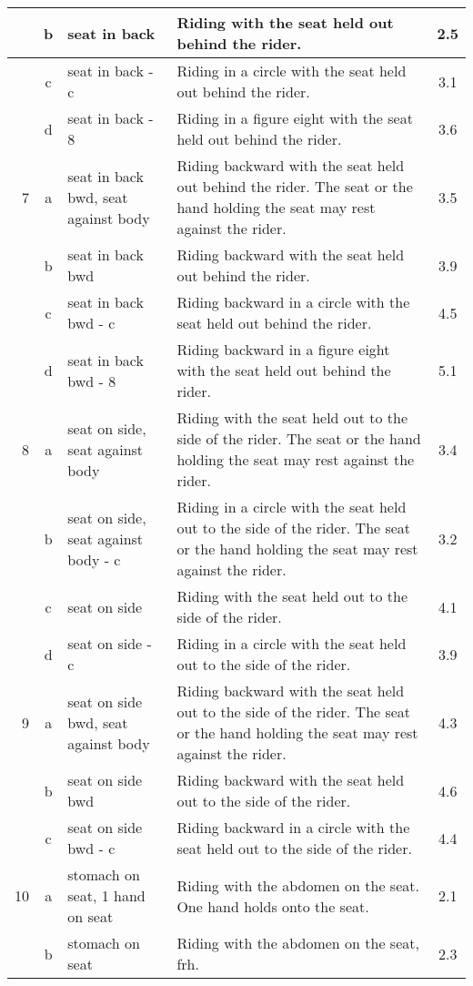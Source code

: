 \begin{longtable}{|r|c|p{4cm}|p{8cm}|c|}
\hline
  & b & seat in back  & Riding with the seat held out behind the rider. & 2.5 \\ 
\hline
  & c & seat in back - c  & Riding in a circle with the seat held out behind the rider. & 3.1 \\ 
\hline
  & d & seat in back - 8  & Riding in a figure eight with the seat held out behind the rider. & 3.6 \\ 
\hline
7 & a & seat in back bwd, seat against body & Riding backward with the seat held out behind the rider. The seat or the hand holding the seat may rest against the rider.  & 3.5 \\ 
\hline
  & b & seat in back bwd  & Riding backward with the seat held out behind the rider.  & 3.9 \\ 
\hline
  & c & seat in back bwd - c  & Riding backward in a circle with the seat held out behind the rider.  & 4.5 \\ 
\hline
  & d & seat in back bwd - 8  & Riding backward in a figure eight with the seat held out behind the rider.  & 5.1 \\ 
\hline
8 & a & seat on side, seat against body & Riding with the seat held out to the side of the rider. The seat or the hand holding the seat may rest against the rider. & 3.4 \\ 
\hline
  & b & seat on side, seat against body - c & Riding in a circle with the seat held out to the side of the rider. The seat or the hand holding the seat may rest against the rider. & 3.2 \\ 
\hline
  & c & seat on side  & Riding with the seat held out to the side of the rider. & 4.1 \\ 
\hline
  & d & seat on side - c  & Riding in a circle with the seat held out to the side of the rider. & 3.9 \\ 
\hline
9 & a & seat on side bwd, seat against body & Riding backward with the seat held out to the side of the rider. The seat or the hand holding the seat may rest against the rider.  & 4.3 \\ 
\hline
  & b & seat on side bwd  & Riding backward with the seat held out to the side of the rider.  & 4.6 \\ 
\hline
  & c & seat on side bwd - c  & Riding backward in a circle with the seat held out to the side of the rider.  & 4.4 \\ 
\hline
10  & a & stomach on seat, 1 hand on seat & Riding with the abdomen on the seat. One hand holds onto the seat.  & 2.1 \\ 
\hline
  & b & stomach on seat & Riding with the abdomen on the seat, frh. & 2.3 \\ 

\end{longtable}
